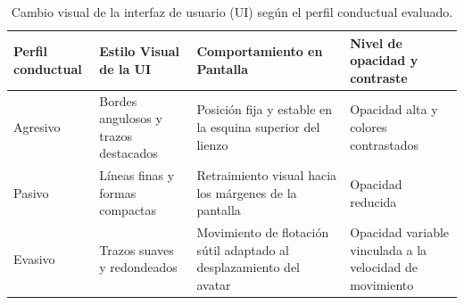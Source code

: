\begin{table}[H]
  \centering
  \caption{Cambio visual de la interfaz de usuario (UI) según el perfil conductual evaluado.}
  \label{tab:CambioVisualUI}
  \small
  \renewcommand{\arraystretch}{1.2}
  \begin{tabularx}{\textwidth}{>{\raggedright\arraybackslash}p{2.5cm}YYY}
    \toprule
    Perfil conductual & Estilo Visual de la UI & Comportamiento en Pantalla & Nivel de opacidad y contraste \\
    \midrule
    Agresivo & Bordes angulosos y trazos destacados & Posición fija y estable en la esquina superior del lienzo & Opacidad alta y colores contrastados\\
    Pasivo & Líneas finas y formas compactas & Retraimiento visual hacia los márgenes de la pantalla & Opacidad reducida\\
    Evasivo & Trazos suaves y redondeados & Movimiento de flotación sútil adaptado al desplazamiento del avatar & Opacidad variable vinculada a la velocidad de movimiento\\
    \bottomrule
  \end{tabularx}
\end{table}


